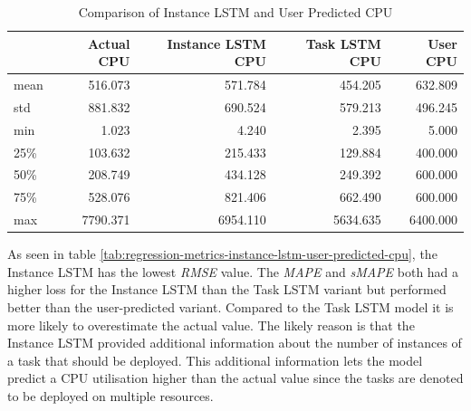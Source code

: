       \begin{table}
        \centering
        \caption{Comparison of Instance LSTM and User Predicted CPU}
        \label{tab:comparison-instance-lstm-user-predicted-cpu}

        \begin{tabular}{|l|rrrr|}
          \toprule
          {} &  Actual CPU &  Instance LSTM CPU &  Task LSTM CPU &  User CPU \\
          \midrule
          mean &     516.073 &            571.784 &        454.205 &   632.809 \\
          std  &     881.832 &            690.524 &        579.213 &   496.245 \\
          min  &       1.023 &              4.240 &          2.395 &     5.000 \\
          25\%  &     103.632 &            215.433 &        129.884 &   400.000 \\
          50\%  &     208.749 &            434.128 &        249.392 &   600.000 \\
          75\%  &     528.076 &            821.406 &        662.490 &   600.000 \\
          max  &    7790.371 &           6954.110 &       5634.635 &  6400.000 \\
          \bottomrule
          \end{tabular}
      \end{table}

      As seen in table \ref{tab:regression-metrics-instance-lstm-user-predicted-cpu}, the Instance LSTM has the lowest \emph{RMSE} value.
      The \emph{MAPE} and \emph{sMAPE} both had a higher loss for the Instance LSTM than the Task LSTM variant but performed better than the user-predicted variant. Compared to the Task LSTM model it is more likely to overestimate the actual value. The likely reason is that the Instance LSTM provided additional information about the number of instances of a task that should be deployed. This additional information lets the model predict a CPU utilisation higher than the actual value since the tasks are denoted to be deployed on multiple resources.
      
